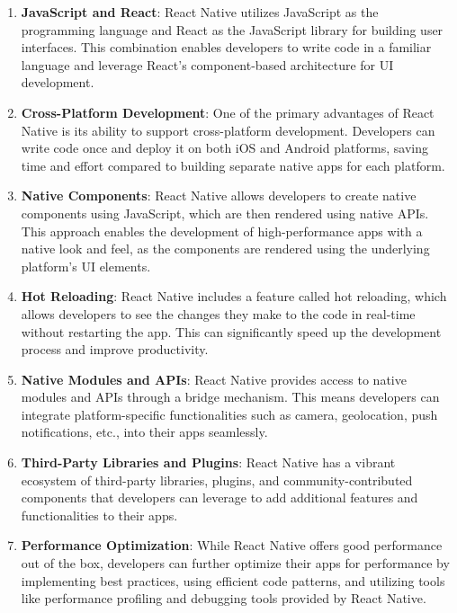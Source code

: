 \begin{enumerate}
  \item \textbf{JavaScript and React}: React Native utilizes JavaScript as the programming language and React as the JavaScript library for building user interfaces. This combination enables developers to write code in a familiar language and leverage React's component-based architecture for UI development.
  
  \item \textbf{Cross-Platform Development}: One of the primary advantages of React Native is its ability to support cross-platform development. Developers can write code once and deploy it on both iOS and Android platforms, saving time and effort compared to building separate native apps for each platform.
  
  \item \textbf{Native Components}: React Native allows developers to create native components using JavaScript, which are then rendered using native APIs. This approach enables the development of high-performance apps with a native look and feel, as the components are rendered using the underlying platform's UI elements.
  
  \item \textbf{Hot Reloading}: React Native includes a feature called hot reloading, which allows developers to see the changes they make to the code in real-time without restarting the app. This can significantly speed up the development process and improve productivity.
  
  \item \textbf{Native Modules and APIs}: React Native provides access to native modules and APIs through a bridge mechanism. This means developers can integrate platform-specific functionalities such as camera, geolocation, push notifications, etc., into their apps seamlessly.
  
  \item \textbf{Third-Party Libraries and Plugins}: React Native has a vibrant ecosystem of third-party libraries, plugins, and community-contributed components that developers can leverage to add additional features and functionalities to their apps.
  
  \item \textbf{Performance Optimization}: While React Native offers good performance out of the box, developers can further optimize their apps for performance by implementing best practices, using efficient code patterns, and utilizing tools like performance profiling and debugging tools provided by React Native.
  

\end{enumerate}
